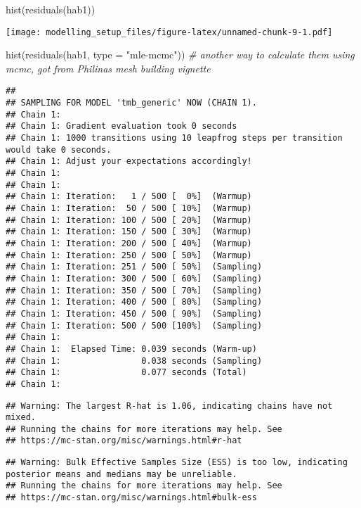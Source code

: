 \documentclass[
]{article}
\newenvironment{Shaded}{\begin{snugshade}}{\end{snugshade}}
\newcommand{\AttributeTok}[1]{\textcolor[rgb]{0.77,0.63,0.00}{#1}}
\newcommand{\CommentTok}[1]{\textcolor[rgb]{0.56,0.35,0.01}{\textit{#1}}}
\newcommand{\FunctionTok}[1]{\textcolor[rgb]{0.00,0.00,0.00}{#1}}
\newcommand{\NormalTok}[1]{#1}
\newcommand{\StringTok}[1]{\textcolor[rgb]{0.31,0.60,0.02}{#1}}
\begin{document}
\begin{Shaded}
\begin{Highlighting}[]
\FunctionTok{hist}\NormalTok{(}\FunctionTok{residuals}\NormalTok{(hab1)) }
\end{Highlighting}
\end{Shaded}

\texttt{[image: modelling\_setup\_files/figure-latex/unnamed-chunk-9-1.pdf]}

\begin{Shaded}
\begin{Highlighting}[]
\FunctionTok{hist}\NormalTok{(}\FunctionTok{residuals}\NormalTok{(hab1, }\AttributeTok{type =} \StringTok{"mle{-}mcmc"}\NormalTok{)) }\CommentTok{\# another way to calculate them using mcmc, got from Philina\textquotesingle{}s mesh building vignette}
\end{Highlighting}
\end{Shaded}

\begin{verbatim}
## 
## SAMPLING FOR MODEL 'tmb_generic' NOW (CHAIN 1).
## Chain 1: 
## Chain 1: Gradient evaluation took 0 seconds
## Chain 1: 1000 transitions using 10 leapfrog steps per transition would take 0 seconds.
## Chain 1: Adjust your expectations accordingly!
## Chain 1: 
## Chain 1: 
## Chain 1: Iteration:   1 / 500 [  0%]  (Warmup)
## Chain 1: Iteration:  50 / 500 [ 10%]  (Warmup)
## Chain 1: Iteration: 100 / 500 [ 20%]  (Warmup)
## Chain 1: Iteration: 150 / 500 [ 30%]  (Warmup)
## Chain 1: Iteration: 200 / 500 [ 40%]  (Warmup)
## Chain 1: Iteration: 250 / 500 [ 50%]  (Warmup)
## Chain 1: Iteration: 251 / 500 [ 50%]  (Sampling)
## Chain 1: Iteration: 300 / 500 [ 60%]  (Sampling)
## Chain 1: Iteration: 350 / 500 [ 70%]  (Sampling)
## Chain 1: Iteration: 400 / 500 [ 80%]  (Sampling)
## Chain 1: Iteration: 450 / 500 [ 90%]  (Sampling)
## Chain 1: Iteration: 500 / 500 [100%]  (Sampling)
## Chain 1: 
## Chain 1:  Elapsed Time: 0.039 seconds (Warm-up)
## Chain 1:                0.038 seconds (Sampling)
## Chain 1:                0.077 seconds (Total)
## Chain 1:
\end{verbatim}

\begin{verbatim}
## Warning: The largest R-hat is 1.06, indicating chains have not mixed.
## Running the chains for more iterations may help. See
## https://mc-stan.org/misc/warnings.html#r-hat
\end{verbatim}

\begin{verbatim}
## Warning: Bulk Effective Samples Size (ESS) is too low, indicating posterior means and medians may be unreliable.
## Running the chains for more iterations may help. See
## https://mc-stan.org/misc/warnings.html#bulk-ess
\end{verbatim}
\end{document}
